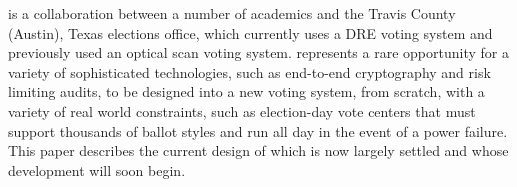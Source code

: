 \projname is a collaboration between a number of academics and
the Travis County (Austin), Texas elections office, which currently
uses a DRE voting system and previously used an optical scan voting system. 
\projname represents a rare opportunity for a variety of
sophisticated technologies, such as end-to-end cryptography and risk limiting
audits, to be designed into a new voting system, from scratch, with
a variety of real world constraints, such as election-day vote centers
that must support thousands of ballot styles and run
all day in the event of a power failure. This paper describes the
current design of \projname which is now largely settled and whose
development will soon begin.


